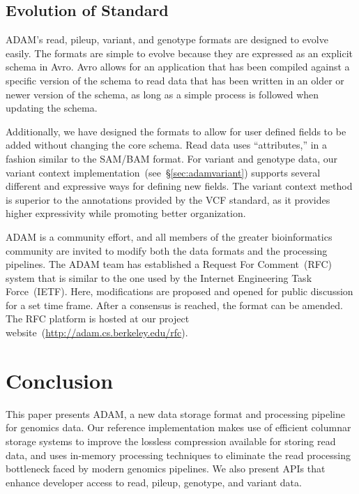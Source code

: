 \documentclass{bioinfo}
\begin{document}
\subsection{Evolution of Standard}
\label{sec:evolution-of-standard}

ADAM's read, pileup, variant, and genotype formats are designed to evolve easily. The formats are simple to evolve because they are expressed as an explicit schema
in Avro. Avro allows for an application that has been compiled against a specific version of the schema to read data that has been written in an older or newer version of the
schema, as long as a simple process is followed when updating the schema.

Additionally, we have designed the formats to allow for user defined fields to be added without changing the core schema. Read data uses ``attributes,'' in a fashion similar to
the SAM/BAM format. For variant and genotype data, our variant context implementation~(see~\S\ref{sec:adamvariant}) supports several different and expressive ways for
defining new fields. The variant context method is superior to the annotations provided by the VCF standard, as it provides higher expressivity while promoting better
organization.

ADAM is a community effort, and all members of the greater bioinformatics community are invited to modify both the data formats and the processing pipelines. The ADAM team
has established a Request For Comment~(RFC) system that is similar to the one used by the Internet Engineering Task Force~(IETF). Here, modifications are proposed and
opened for public discussion for a set time frame. After a consensus is reached, the format can be amended. The RFC platform is hosted at our project
website~(\url{http://adam.cs.berkeley.edu/rfc}).

\section{Conclusion}
\label{sec:conclusion}

This paper presents ADAM, a new data storage format and processing pipeline for genomics data. Our reference implementation makes use of efficient columnar storage
systems to improve the lossless compression available for storing read data, and uses in-memory processing techniques to eliminate the read processing bottleneck faced by
modern genomics pipelines. We also present APIs that enhance developer access to read, pileup, genotype, and variant data.
\end{document}
